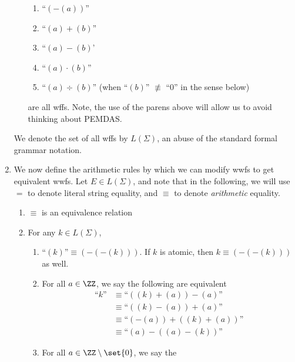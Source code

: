 \begin{example}
\begin{enumerate}
\begin{enumerate}[label=(\alph*)]
\begin{enumerate}[label=\roman*)]
            \item ``$(-(a))$''
            \item ``$(a) + (b)$''
            \item ``$(a) - (b)$'
            \item ``$(a) \cdot (b)$''
            \item ``$(a) \div (b)$'' (when ``$(b)$'' $\not\equiv$
              ``$0$'' in the sense below)
          \end{enumerate}
          are all wffs. Note, the use of the parens above will allow
          us to avoid thinking about PEMDAS.
      \end{enumerate}
      We denote the set of all wffs by $L(\Sigma)$, an abuse of the
      standard formal grammar notation.
    \item We now define the arithmetic rules by which we can modify
      wwfs to get equivalent wwfs. Let $E \in L(\Sigma)$, and note
      that in the following, we will use $=$ to denote literal string
      equality, and $\equiv$ to denote \emph{arithmetic} equality.
      \begin{enumerate}
        \newcommand{\qms}[1]{\text{``}#1\text{''}}
        \item $\equiv$ is an equivalence relation
        \item For any $k \in L(\Sigma)$,
          \begin{enumerate}[label=\roman*)]
            \item $\qms{(k)} \equiv (-(-(k)))$. If $k$ is atomic, then
              $k \equiv (-(-(k)))$ as well.
            \item For all $a \in \ZZ$, we say the following are equivalent
              \begin{align*}
                \qms{k}
                &\equiv \qms{((k)+(a))-(a)} \\
                &\equiv \qms{((k)-(a))+(a)} \\
                &\equiv \qms{(-(a)) + ((k)+(a))} \\
                &\equiv \qms{(a) - ((a)-(k))}
              \end{align*}
            \item For all $a \in \ZZ\setminus\set{0}$, we say the

\end{enumerate}
\end{enumerate}
\end{enumerate}
\end{example}
